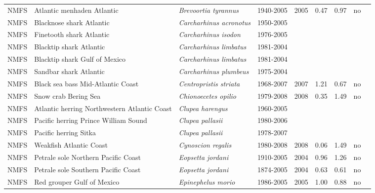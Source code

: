 \begin{longtable}{p{1.8cm}p{4cm}p{4cm}ccccp{1.9cm}c}
  NMFS & Atlantic menhaden Atlantic & \textit{Brevoortia tyrannus} & 1940-2005 & 2005 & 0.47 & 0.97 & no & \cite{Atl.Menhaden-ASMFC-2006.pdf} \\ 
  NMFS & Blacknose shark Atlantic & \textit{Carcharhinus acronotus} & 1950-2005 &  &  &  &  & \cite{SmallcoastalAtl2007-SEFSC.pdf} \\ 
  NMFS & Finetooth shark Atlantic & \textit{Carcharhinus isodon} & 1976-2005 &  &  &  &  & \cite{SmallcoastalAtl2007-SEFSC.pdf} \\ 
  NMFS & Blacktip shark Atlantic & \textit{Carcharhinus limbatus} & 1981-2004 &  &  &  &  & \cite{LargeCoastalAtl2006-SEFSC.pdf} \\ 
  NMFS & Blacktip shark Gulf of Mexico & \textit{Carcharhinus limbatus} & 1981-2004 &  &  &  &  & \cite{LargeCoastalAtl2006-SEFSC.pdf} \\ 
  NMFS & Sandbar shark Atlantic & \textit{Carcharhinus plumbeus} & 1975-2004 &  &  &  &  & \cite{LargeCoastalAtl2006-SEFSC.pdf} \\ 
  NMFS & Black sea bass Mid-Atlantic Coast & \textit{Centropristis striata} & 1968-2007 & 2007 & 1.21 & 0.67 & no & \cite{DataPoorReviewPanelReportFinal-1-20-09.pdf} \\ 
  NMFS & Snow crab Bering Sea & \textit{Chionoecetes opilio} & 1979-2008 & 2008 & 0.35 & 1.49 & no & \cite{CRABSAFE2008.pdf} \\ 
  NMFS & Atlantic herring Northwestern Atlantic Coast & \textit{Clupea harengus} & 1960-2005 &  &  &  &  & \cite{Herring2006.pdf} \\ 
  NMFS & Pacific herring Prince William Sound & \textit{Clupea pallasii} & 1980-2006 &  &  &  &  & \cite{NA} \\ 
  NMFS & Pacific herring Sitka & \textit{Clupea pallasii} & 1978-2007 &  &  &  &  & \cite{NA} \\ 
  NMFS & Weakfish Atlantic Coast & \textit{Cynoscion regalis} & 1980-2008 & 2008 & 0.06 & 1.49 & no & \cite{NEFSC-Weakfish-2009.pdf} \\ 
  NMFS & Petrale sole Northern Pacific Coast & \textit{Eopsetta jordani} & 1910-2005 & 2004 & 0.96 & 1.26 & no & \cite{2004_SAFE_WCpetralesole.pdf} \\ 
  NMFS & Petrale sole Southern Pacific Coast & \textit{Eopsetta jordani} & 1874-2005 & 2004 & 0.63 & 0.61 & no & \cite{2004-SAFE-WCpetralesole.pdf} \\ 
  NMFS & Red grouper Gulf of Mexico & \textit{Epinephelus morio} & 1986-2005 & 2005 & 1.00 & 0.88 & no & \cite{JENSEN_RGROUPGM-2006.pdf} \\ 

\end{longtable}
